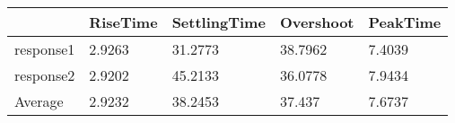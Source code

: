 \begin{tabular}{lllll}
  & RiseTime & SettlingTime & Overshoot & PeakTime \\ 
\hline 
response1 & 2.9263 & 31.2773 & 38.7962 & 7.4039 \\ 
response2 & 2.9202 & 45.2133 & 36.0778 & 7.9434 \\ 
Average & 2.9232 & 38.2453 & 37.437 & 7.6737 \\ 
\hline 
\end{tabular}